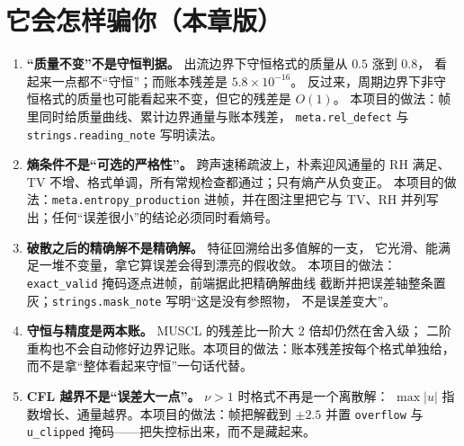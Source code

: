 

\section{它会怎样骗你（本章版）}

\begin{enumerate}
  \item \textbf{``质量不变''不是守恒判据。} 出流边界下守恒格式的质量从 $0.5$ 涨到 $0.8$，
        看起来一点都不``守恒''；而账本残差是 $5.8\times10^{-16}$。
        反过来，周期边界下非守恒格式的质量也可能看起来不变，但它的残差是 $O(1)$。
        本项目的做法：帧里同时给质量曲线、累计边界通量与账本残差，
        \texttt{meta.rel\_defect} 与 \texttt{strings.reading\_note} 写明读法。
  \item \textbf{熵条件不是``可选的严格性''。} 跨声速稀疏波上，朴素迎风通量的
        RH 满足、TV 不增、格式单调，所有常规检查都通过；只有熵产从负变正。
        本项目的做法：\texttt{meta.entropy\_production} 进帧，并在图注里把它与
        TV、RH 并列写出；任何``误差很小''的结论必须同时看熵号。
  \item \textbf{破散之后的精确解不是精确解。} 特征回溯给出多值解的一支，
        它光滑、能满足一堆不变量，拿它算误差会得到漂亮的假收敛。
        本项目的做法：\texttt{exact\_valid} 掩码逐点进帧，前端据此把精确解曲线
        截断并把误差轴整条置灰；\texttt{strings.mask\_note} 写明``这是没有参照物，
        不是误差变大''。
  \item \textbf{守恒与精度是两本账。} MUSCL 的残差比一阶大 2 倍却仍然在舍入级；
        二阶重构也不会自动修好边界记账。本项目的做法：账本残差按每个格式单独给，
        而不是拿``整体看起来守恒''一句话代替。
  \item \textbf{CFL 越界不是``误差大一点''。} $\nu>1$ 时格式不再是一个离散解：
        $\max|u|$ 指数增长、通量越界。本项目的做法：帧把解截到 $\pm2.5$ 并置
        \texttt{overflow} 与 \texttt{u\_clipped} 掩码——把失控标出来，而不是藏起来。
\end{enumerate}
